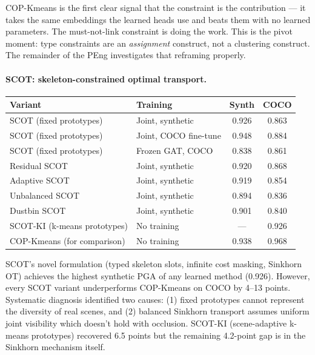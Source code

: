 \vspace{0.5em}

COP-Kmeans is the first clear signal that the constraint is the contribution --- it takes the same embeddings the learned heads use and beats them with no learned parameters. The must-not-link constraint is doing the work. This is the pivot moment: type constraints are an \emph{assignment} construct, not a clustering construct. The remainder of the PEng investigates that reframing properly.

\paragraph{SCOT: skeleton-constrained optimal transport.}

\begin{tabular}{llcc}
\hline
\textbf{Variant} & \textbf{Training} & \textbf{Synth} & \textbf{COCO} \\
\hline
SCOT (fixed prototypes) & Joint, synthetic & 0.926 & 0.863 \\
SCOT (fixed prototypes) & Joint, COCO fine-tune & 0.948 & 0.884 \\
SCOT (fixed prototypes) & Frozen GAT, COCO & 0.838 & 0.861 \\
Residual SCOT & Joint, synthetic & 0.920 & 0.868 \\
Adaptive SCOT & Joint, synthetic & 0.919 & 0.854 \\
Unbalanced SCOT & Joint, synthetic & 0.894 & 0.836 \\
Dustbin SCOT & Joint, synthetic & 0.901 & 0.840 \\
SCOT-KI (k-means prototypes) & No training & --- & 0.926 \\
\hline
COP-Kmeans (for comparison) & No training & 0.938 & 0.968 \\
\hline
\end{tabular}

\vspace{0.5em}

SCOT's novel formulation (typed skeleton slots, infinite cost masking, Sinkhorn OT) achieves the highest synthetic PGA of any learned method (0.926). However, every SCOT variant underperforms COP-Kmeans on COCO by 4--13 points. Systematic diagnosis identified two causes: (1) fixed prototypes cannot represent the diversity of real scenes, and (2) balanced Sinkhorn transport assumes uniform joint visibility which doesn't hold with occlusion. SCOT-KI (scene-adaptive k-means prototypes) recovered 6.5 points but the remaining 4.2-point gap is in the Sinkhorn mechanism itself.

